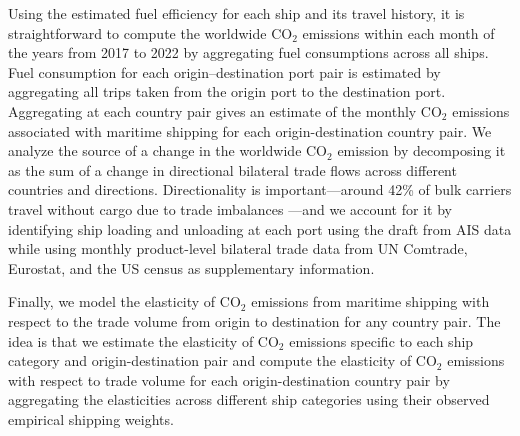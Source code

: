 \documentclass[hidelinks, 12pt,letterpaper]{article}
\begin{document}
Using the estimated fuel efficiency for each ship and its travel history, it is straightforward to compute the worldwide CO$_2$ emissions within each month of the years from 2017 to 2022 by aggregating fuel consumptions across all ships. Fuel consumption for each origin--destination port pair
is estimated by aggregating all trips taken from the origin port to the destination port. Aggregating at each country pair gives an estimate of the monthly CO$_2$ emissions associated with maritime shipping for each origin-destination country pair.
We analyze the source of a change in the worldwide CO$_2$ emission by decomposing it as the sum of a change in directional bilateral trade flows across different countries and directions. Directionality is important---around 42\% of bulk carriers travel without cargo due to trade imbalances \citep{brancaccio2020geography}---and we account for it by identifying ship loading and unloading at each port using the draft from AIS data while using monthly  product-level bilateral trade data from UN Comtrade, Eurostat, and the US census as supplementary information.




Finally, we model the elasticity of CO$_2$ emissions from maritime shipping with respect to the trade volume from origin to destination for any country pair. The idea is that we estimate  the elasticity of CO$_2$ emissions specific to each ship category and origin-destination pair and compute the elasticity of CO$_2$ emissions with respect to trade volume for each origin-destination country pair by aggregating the elasticities across different ship categories using their  observed empirical shipping weights.
\end{document}
